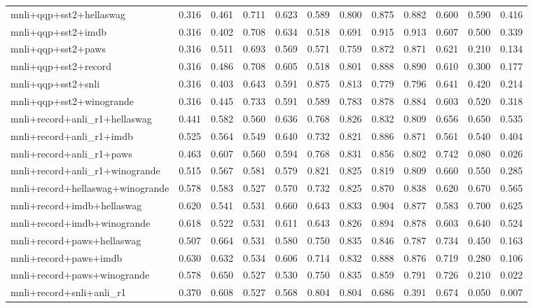 \begin{table}[t]
\begin{tabular}{lrrrrrrrrrrr}
    mnli+qqp+sst2+hellaswag & 0.316 & 0.461 & 0.711 & 0.623 & 0.589 & 0.800 & 0.875 & 0.882 & 0.600 & 0.590 & 0.416 \\
    mnli+qqp+sst2+imdb & 0.316 & 0.402 & 0.708 & 0.634 & 0.518 & 0.691 & 0.915 & 0.913 & 0.607 & 0.500 & 0.339 \\
    mnli+qqp+sst2+paws & 0.316 & 0.511 & 0.693 & 0.569 & 0.571 & 0.759 & 0.872 & 0.871 & 0.621 & 0.210 & 0.134 \\
    mnli+qqp+sst2+record & 0.316 & 0.486 & 0.708 & 0.605 & 0.518 & 0.801 & 0.888 & 0.890 & 0.610 & 0.300 & 0.177 \\
    mnli+qqp+sst2+snli & 0.316 & 0.403 & 0.643 & 0.591 & 0.875 & 0.813 & 0.779 & 0.796 & 0.641 & 0.420 & 0.214 \\
    mnli+qqp+sst2+winogrande & 0.316 & 0.445 & 0.733 & 0.591 & 0.589 & 0.783 & 0.878 & 0.884 & 0.603 & 0.520 & 0.318 \\
    mnli+record+anli\_r1+hellaswag & 0.441 & 0.582 & 0.560 & 0.636 & 0.768 & 0.826 & 0.832 & 0.809 & 0.656 & 0.650 & 0.535 \\
    mnli+record+anli\_r1+imdb & 0.525 & 0.564 & 0.549 & 0.640 & 0.732 & 0.821 & 0.886 & 0.871 & 0.561 & 0.540 & 0.404 \\
    mnli+record+anli\_r1+paws & 0.463 & 0.607 & 0.560 & 0.594 & 0.768 & 0.831 & 0.856 & 0.802 & 0.742 & 0.080 & 0.026 \\
    mnli+record+anli\_r1+winogrande & 0.515 & 0.567 & 0.581 & 0.579 & 0.821 & 0.825 & 0.819 & 0.809 & 0.660 & 0.550 & 0.285 \\
    mnli+record+hellaswag+winogrande & 0.578 & 0.583 & 0.527 & 0.570 & 0.732 & 0.825 & 0.870 & 0.838 & 0.620 & 0.670 & 0.565 \\
    mnli+record+imdb+hellaswag & 0.620 & 0.541 & 0.531 & 0.660 & 0.643 & 0.833 & 0.904 & 0.877 & 0.583 & 0.700 & 0.625 \\
    mnli+record+imdb+winogrande & 0.618 & 0.522 & 0.531 & 0.611 & 0.643 & 0.826 & 0.894 & 0.878 & 0.603 & 0.640 & 0.524 \\
    mnli+record+paws+hellaswag & 0.507 & 0.664 & 0.531 & 0.580 & 0.750 & 0.835 & 0.846 & 0.787 & 0.734 & 0.450 & 0.163 \\
    mnli+record+paws+imdb & 0.630 & 0.632 & 0.534 & 0.606 & 0.714 & 0.832 & 0.888 & 0.876 & 0.719 & 0.280 & 0.106 \\
    mnli+record+paws+winogrande & 0.578 & 0.650 & 0.527 & 0.530 & 0.750 & 0.835 & 0.859 & 0.791 & 0.726 & 0.210 & 0.022 \\
    mnli+record+snli+anli\_r1 & 0.370 & 0.608 & 0.527 & 0.568 & 0.804 & 0.804 & 0.686 & 0.391 & 0.674 & 0.050 & 0.007 \\

\end{tabular}
\end{table}
